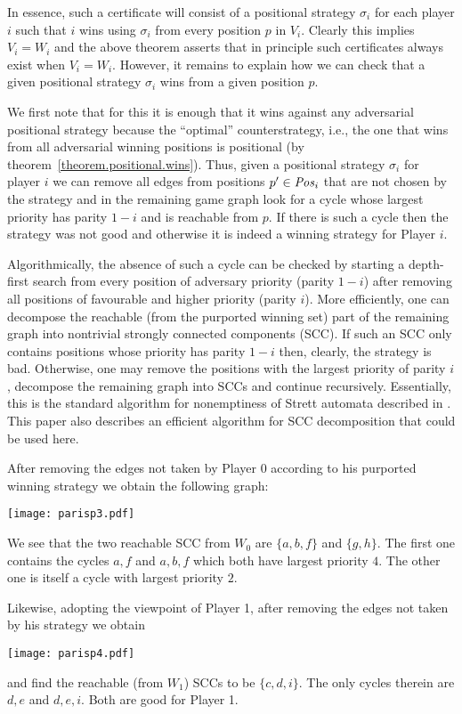 In essence, such a certificate will consist of a positional strategy
$\sigma_i$ for each player $i$ such that $i$ wins using $\sigma_i$
from every position $p$ in $V_i$\@. Clearly this implies $V_i=W_i$ and
the above theorem asserts that in principle such certificates always
exist when $V_i=W_i$. However, it remains to explain how we can check
that a given positional strategy $\sigma_i$ wins from a given position
$p$\@.

We first note that for this it is enough that it wins against any
adversarial positional strategy because the ``optimal''
counterstrategy, i.e., the one that wins from all adversarial winning
positions is positional (by theorem~\ref{theorem.positional.wins})\@. 
Thus, given a positional strategy $\sigma_i$ for player $i$ we can remove all edges from
positions $p'\in\mathit{Pos}_i$ that are not chosen by the strategy and in the
remaining game graph look for a cycle whose largest priority has
parity $1-i$ and is reachable from $p$\@. If there is such a cycle
then the strategy was not good and otherwise it is indeed a winning
strategy for Player $i$\@. 

Algorithmically, the absence of such a cycle can be checked by
starting a depth-first search from every position of adversary
priority (parity $1-i$) after removing all positions of favourable and
higher priority (parity $i$). More efficiently, one can decompose
the reachable (from the purported winning set) part of the remaining
graph into nontrivial strongly connected components (SCC). If such an
SCC only contains positions whose priority has parity $1-i$ then,
clearly, the strategy is bad. Otherwise, one may remove the positions
with the largest priority of parity $i$, decompose the remaining graph
into SCCs and continue recursively. Essentially, this is the standard
algorithm for nonemptiness of Strett automata described in
\cite{DBLP:journals/fmsd/BloemGS06}. This paper also describes an
efficient algorithm for SCC decomposition that could be used here.
\begin{example}
After removing the edges not taken by Player 0 according to his purported winning strategy we obtain the following graph: 

\texttt{[image: parisp3.pdf]}

We see that the two reachable SCC from $W_0$ are $\{a,b,f\}$ and
$\{g,h\}$. The first one contains the cycles $a,f$ and $a,b,f$ which
both have largest priority $4$. The other one is itself a cycle with
largest priority $2$.

Likewise, adopting the viewpoint of Player 1, after removing the edges
not taken by his strategy we obtain

\texttt{[image: parisp4.pdf]}

and find the reachable (from $W_1$) SCCs to be $\{c,d,i\}$. The only cycles therein are $d,e$ and $d,e,i$. Both are good for Player 1. 
\end{example}
